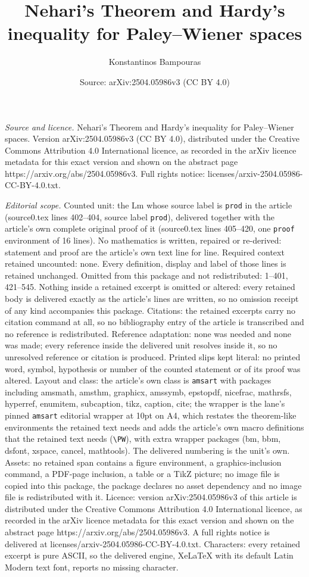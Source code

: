 \documentclass[10pt,a4paper]{amsart}
\title[Nehari's Theorem and Hardy's inequality for Paley--Wiener sp]{Nehari's Theorem and Hardy's inequality for Paley--Wiener spaces}
\author{Konstantinos Bampouras}
\date{Source: arXiv:2504.05986v3 (CC BY 4.0)}
\begin{document}
\maketitle

\noindent\emph{Source and licence.} Nehari's Theorem and Hardy's inequality for Paley--Wiener spaces. Version arXiv:2504.05986v3 (CC BY 4.0), distributed under the Creative Commons Attribution 4.0 International licence, as recorded in the arXiv licence metadata for this exact version and shown on the abstract page https://arxiv.org/abs/2504.05986v3. Full rights notice: licenses/arxiv-2504.05986-CC-BY-4.0.txt.\par\smallskip

\noindent\textit{Editorial scope.} Counted unit: the Lm whose source label is \texttt{prod} in the article (source0.tex lines 402--404, source label \texttt{prod}), delivered together with the article's own complete original proof of it (source0.tex lines 405--420, one \texttt{proof} environment of 16 lines). No mathematics is written, repaired or re-derived: statement and proof are the article's own text line for line. Required context retained uncounted: none. Every definition, display and label of those lines is retained unchanged. Omitted from this package and not redistributed: 1--401, 421--545. Nothing inside a retained excerpt is omitted or altered: every retained body is delivered exactly as the article's lines are written, so no omission receipt of any kind accompanies this package. Citations: the retained excerpts carry no citation command at all, so no bibliography entry of the article is transcribed and no reference is redistributed. Reference adaptation: none was needed and none was made; every reference inside the delivered unit resolves inside it, so no unresolved reference or citation is produced. Printed slips kept literal: no printed word, symbol, hypothesis or number of the counted statement or of its proof was altered. Layout and class: the article's own class is \texttt{amsart} with packages including amsmath, amsthm, graphicx, amssymb, epstopdf, nicefrac, mathrsfs, hyperref, enumitem, subcaption, tikz, caption, cite; the wrapper is the lane's pinned \texttt{amsart} editorial wrapper at 10pt on A4, which restates the theorem-like environments the retained text needs and adds the article's own macro definitions that the retained text needs (\texttt{\textbackslash PW}), with extra wrapper packages (bm, bbm, dsfont, xspace, cancel, mathtools). The delivered numbering is the unit's own. Assets: no retained span contains a figure environment, a graphics-inclusion command, a PDF-page inclusion, a table or a TikZ picture; no image file is copied into this package, the package declares no asset dependency and no image file is redistributed with it. Licence: version arXiv:2504.05986v3 of this article is distributed under the Creative Commons Attribution 4.0 International licence, as recorded in the arXiv licence metadata for this exact version and shown on the abstract page https://arxiv.org/abs/2504.05986v3. A full rights notice is delivered at licenses/arxiv-2504.05986-CC-BY-4.0.txt. Characters: every retained excerpt is pure ASCII, so the delivered engine, XeLaTeX with its default Latin Modern text font, reports no missing character.
\end{document}
